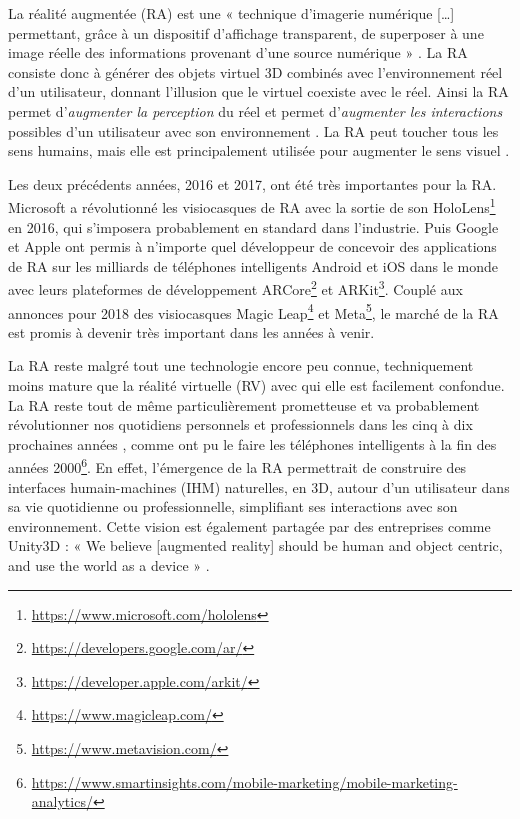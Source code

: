 La réalité augmentée (RA) est une « technique d'imagerie numérique […] permettant, grâce à un dispositif d'affichage transparent, de superposer à une image réelle des informations provenant d'une source numérique » \citep{OfficeQuebecoisLangueFrancaiseRA2015}. La RA consiste donc à générer des objets virtuel 3D combinés avec l'environnement réel d'un utilisateur, donnant l'illusion que le virtuel coexiste avec le réel. Ainsi la RA permet d'\emph{augmenter la perception} du réel et permet d'\emph{augmenter les interactions} possibles d'un utilisateur avec son environnement \citep{Azuma1997}. La RA peut toucher tous les sens humains, mais elle est principalement utilisée pour augmenter le sens visuel .

Les deux précédents années, 2016 et 2017, ont été très importantes pour la RA. Microsoft a révolutionné les visiocasques de RA avec la sortie de son HoloLens\footnote{\url{https://www.microsoft.com/hololens}} en 2016, qui s'imposera probablement en standard dans l'industrie. Puis Google et Apple ont permis à n'importe quel développeur de concevoir des applications de RA sur les milliards de téléphones intelligents Android et iOS dans le monde avec leurs plateformes de développement ARCore\footnote{\url{https://developers.google.com/ar/}} et ARKit\footnote{\url{https://developer.apple.com/arkit/}}. Couplé aux annonces pour 2018 des visiocasques Magic Leap\footnote{\url{https://www.magicleap.com/}} et Meta\footnote{\url{https://www.metavision.com/}}, le marché de la RA est promis à devenir très important dans les années à venir.


La RA reste malgré tout une technologie encore peu connue, techniquement moins mature que la réalité virtuelle (RV) avec qui elle est facilement confondue. La RA reste tout de même particulièrement prometteuse et va probablement révolutionner nos quotidiens personnels et professionnels dans les cinq à dix prochaines années , comme ont pu le faire les téléphones intelligents à la fin des années 2000\footnote{\url{https://www.smartinsights.com/mobile-marketing/mobile-marketing-analytics/}}. En effet, l'émergence de la RA permettrait de construire des interfaces humain-machines (IHM) naturelles, en 3D, autour d'un utilisateur dans sa vie quotidienne ou professionnelle, simplifiant ses interactions avec son environnement. Cette vision est également partagée par des entreprises comme Unity3D : « We believe [augmented reality] should be human and object centric, and use the world as a device » \citep{UnityFutureMRPartIII2017}.

